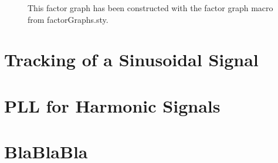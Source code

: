 \documentclass[11pt,a4paper,twoside]{report}
\begin{document}
\begin{figure}[h]
	\centering

  	\caption[Exemplary factor graph]
   	{This factor graph has been constructed with the factor graph macro from factorGraphs.sty.}
	\label{factor_graph}
\end{figure}





\clearpage


\chapter{Tracking of a Sinusoidal Signal}


\chapter{PLL for Harmonic Signals}


\chapter{BlaBlaBla}






\fancyhead[LO]{\scshape\bibname}
\fancyhead[RO]{\scshape\appendixname}
\fancyhead[LE]{\scshape\appendixname}
\fancyhead[RE]{\scshape\bibname}



\end{document}

